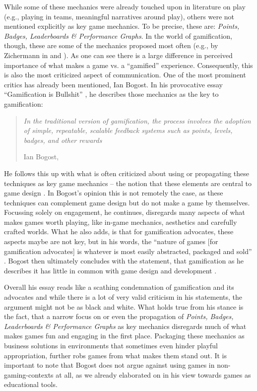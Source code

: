 While some of these mechanics were already touched upon in literature on play (e.g., playing in teams, meaningful narratives around play), others were not mentioned explicitly as key game mechanics. To be precise, these are: \textit{Points, Badges, Leaderboards \& Performance Graphs}. In the world of gamification, though, these are some of the mechanics proposed most often (e.g., by Zichermann in \cite[p. 3]{zichermann2010game} and \cite[p. 35-50]{zichermann2011gamification}). As one can see there is a large difference in perceived importance of what makes a game vs. a \enquote{gamified} experience. Consequently, this is also the most criticized aspect of communication. One of the most prominent critics has already been mentioned, Ian Bogost. In his provocative essay \enquote{Gamification is Bullshit} \cite{bogost2014gamification}, he describes those mechanics as the key to gamification:

\begin{quote}
  \textit{In the traditional version of gamification, the process involves the adoption of simple, repeatable, scalable feedback systems such as points, levels, badges, and other rewards}

  \footnotesize{Ian Bogost, \cite[p. 68]{bogost2014gamification}}
\end{quote}

He follows this up with what is often criticized about using or propagating these techniques as key game mechanics -- the notion that these elements are central to game design \cite[p. 68]{bogost2014gamification}. In Bogost's opinion this is not remotely the case, as these techniques can complement game design but do not make a game by themselves. Focussing solely on engagement, he continues, disregards many aspects of what makes games worth playing, like in-game mechanics, aesthetics and carefully crafted worlds. What he also adds, is that for gamification advocates, these aspects maybe are not key, but in his words, the \enquote{nature of games [for gamification advocates] is whatever is most easily abstracted, packaged and sold} \cite[p. 68]{bogost2014gamification}. Bogost then ultimately concludes with the statement, that gamification as he describes it has little in common with game design and development \cite[p. 72]{bogost2014gamification}.

Overall his essay reads like a scathing condemnation of gamification and its advocates and while there is a lot of very valid criticism in his statements, the argument might not be as black and white. What holds true from his stance is the fact, that a narrow focus on or even the propagation of \textit{Points, Badges, Leaderboards \& Performance Graphs} as key mechanics disregards much of what makes games fun and engaging in the first place. Packaging these mechanics as business solutions in environments that sometimes even hinder playful appropriation, further robs games from what makes them stand out. It is important to note that Bogost does not argue against using games in non-gaming-contexts at all, as we already elaborated on in his view towards games as educational tools.

